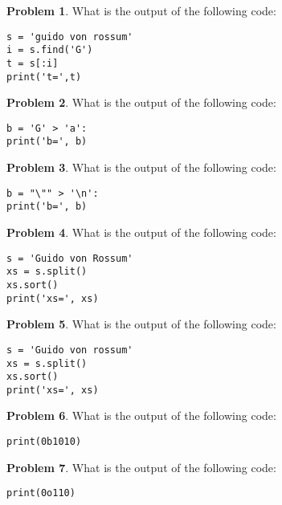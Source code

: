 \documentclass[10pt]{article}
\theoremstyle{definition}
\newtheorem{problem}{Problem}
\begin{document}
\begin{problem}
    What is the output of the following code:
\end{problem}
\begin{lstlisting}
s = 'guido von rossum'
i = s.find('G')
t = s[:i]
print('t=',t)
\end{lstlisting}
\vspace{1.5in}

\begin{problem}
    What is the output of the following code:
\end{problem}
\begin{lstlisting}
b = 'G' > 'a':
print('b=', b)
\end{lstlisting}
\vspace{1.5in}


\begin{problem}
    What is the output of the following code:
\end{problem}
\begin{lstlisting}
b = "\"" > '\n':
print('b=', b)
\end{lstlisting}
\vspace{1.5in}



\begin{problem}
    What is the output of the following code:
\end{problem}
\begin{lstlisting}
s = 'Guido von Rossum'
xs = s.split()
xs.sort()
print('xs=', xs)
\end{lstlisting}
\vspace{1.5in}

\begin{problem}
    What is the output of the following code:
\end{problem}
\begin{lstlisting}
s = 'Guido von rossum'
xs = s.split()
xs.sort()
print('xs=', xs)
\end{lstlisting}
\vspace{1.5in}



\begin{problem}
    What is the output of the following code:
\end{problem}
\begin{lstlisting}
print(0b1010)
\end{lstlisting}
\vspace{1.5in}

\begin{problem}
    What is the output of the following code:
\end{problem}
\begin{lstlisting}
print(0o110)
\end{lstlisting}
\vspace{1.5in}
\end{document}
